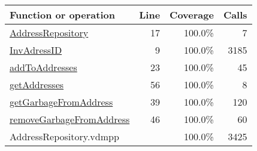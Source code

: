 \begin{longtable}{|l|r|r|r|}
\hline
Function or operation & Line & Coverage & Calls \\
\hline
\hline
\hyperref[AddressRepository:17]{AddressRepository} & 17&100.0\% & 7 \\
\hline
\hyperref[InvAdressID:9]{InvAdressID} & 9&100.0\% & 3185 \\
\hline
\hyperref[addToAddresses:23]{addToAddresses} & 23&100.0\% & 45 \\
\hline
\hyperref[getAddresses:56]{getAddresses} & 56&100.0\% & 8 \\
\hline
\hyperref[getGarbageFromAddress:39]{getGarbageFromAddress} & 39&100.0\% & 120 \\
\hline
\hyperref[removeGarbageFromAddress:46]{removeGarbageFromAddress} & 46&100.0\% & 60 \\
\hline
\hline
AddressRepository.vdmpp & & 100.0\% & 3425 \\
\hline
\end{longtable}


